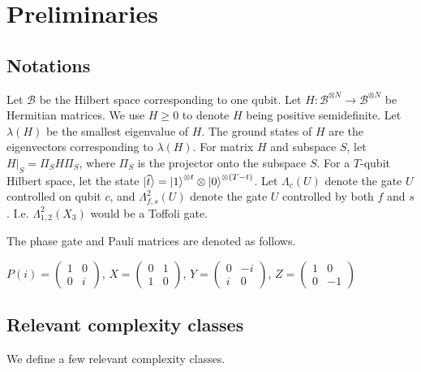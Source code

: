 \section{Preliminaries}

\subsection{Notations}

Let $\mathcal{B}$ be the Hilbert space corresponding to one qubit. Let $H:\mathcal{B}^{\otimes N}\rightarrow\mathcal{B}^{\otimes N}$ be Hermitian matrices. We use $H\geq0$ to denote $H$ being positive semidefinite. Let $\lambda(H)$ be the smallest eigenvalue of $H$. The ground states of $H$ are the eigenvectors corresponding to $\lambda(H)$. For matrix $H$ and subspace $S$, let $H\big|_S=\Pi_S H \Pi_S$, where $\Pi_S$ is the projector onto the subspace $S$. For a $T$-qubit Hilbert space, let the state $\ket{\widehat{t}}=\ket{1}^{\otimes t}\otimes \ket{0}^{{\otimes (T-t)}}$. Let $\Lambda_c(U)$ denote the gate $U$ controlled on qubit $c$, and $\Lambda^2_{f, s}(U)$ denote the gate $U$ controlled by both $f$ and $s$. I.e. $\Lambda^2_{1, 2}(X_3)$ would be a Toffoli gate. 

The phase gate and Pauli matrices are denoted as follows.

\begin{definition}
	$P(i)=\begin{pmatrix}1&0\\0&i\end{pmatrix}$, $X=\begin{pmatrix}0&1\\1&0\end{pmatrix}$,
	$Y=\begin{pmatrix}0&-i\\i&0\end{pmatrix}$,
	$Z=\begin{pmatrix}1&0\\0&-1\end{pmatrix}$
\end{definition}

\subsection{Relevant complexity classes}

We define a few relevant complexity classes.

